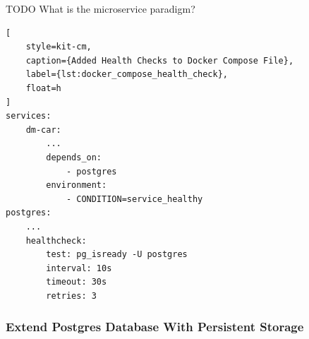 TODO What is the microservice paradigm?

\begin{lstlisting}[
    style=kit-cm,
    caption={Added Health Checks to Docker Compose File},
    label={lst:docker_compose_health_check},
    float=h
]
services:
    dm-car:
        ...
        depends_on:
            - postgres
        environment:
            - CONDITION=service_healthy
postgres:
    ...
    healthcheck:
        test: pg_isready -U postgres
        interval: 10s
        timeout: 30s
        retries: 3
\end{lstlisting}
\subsubsection*{Extend Postgres Database With Persistent Storage}
